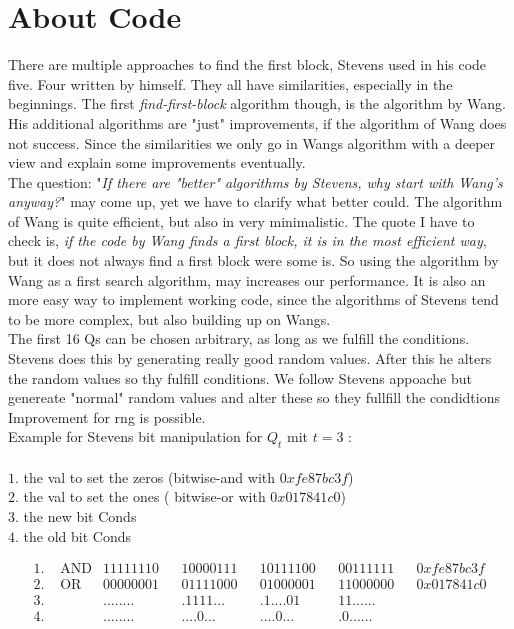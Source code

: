 \section{About Code}
There are multiple approaches to find the first block, Stevens used in his code five. Four written by himself.
They all have similarities, especially in the beginnings. 
The first \textit{find-first-block} algorithm though, is the algorithm by Wang. His additional algorithms are "just" improvements, if the algorithm of Wang does not success.
Since the similarities we only go in Wangs algorithm with a deeper view and explain some improvements eventually.\\
The question: "\textit{If there are "better" algorithms by Stevens, why start with Wang's anyway?}" may come up, yet we have to clarify what better could. The algorithm of Wang is quite efficient, but also in very minimalistic. 
The quote I have to check is, \textit{if the code by Wang finds a first block, it is in the most efficient way}, but it does not always find a first block were some is.
So using the algorithm by Wang as a first search algorithm, may increases our performance. It is also an more easy way to implement working code, since the algorithms of Stevens tend to be more complex, 
but also building up on Wangs.\\ 
The first 16 Qs can be chosen arbitrary, as long as we fulfill the conditions.
Stevens does this by generating really good random values.
After this he alters the random values so thy fulfill conditions.
We follow Stevens appoache but genereate "normal" random values and alter these so they fullfill the condidtions
Improvement for rng is possible. \\
Example for Stevens bit manipulation for $Q_t$ mit $t = 3$ :\\
\\
$1.$ the val to set the zeros (bitwise-and with $0xfe87bc3f$)\\
$2.$ the val to set the ones ( bitwise-or with $0x017841c0$)\\
$3.$ the new bit Conds\\
$4.$ the old bit Conds

\begin{align*}    
    1.& \text{ AND} & 11111110 & & 10000111 & & 10111100 & & 00111111 & & 0xfe87bc3f \\
    2.& \text{ OR}  & 00000001 & & 01111000 & & 01000001 & & 11000000 & & 0x017841c0 \\
    3.&             & ........ & & .1111... & & .1....01 & & 11...... & &  \\
    4.&             & ........ & & ....0... & & ....0... & & .0...... & &  
\end{align*}

